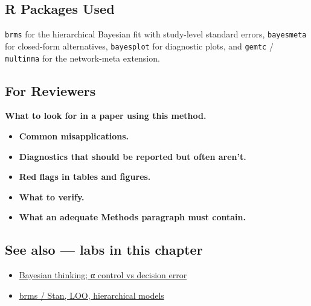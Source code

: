 \documentclass[
]{article}
\providecommand{\tightlist}{%
  \setlength{\itemsep}{0pt}\setlength{\parskip}{0pt}}
\begin{document}
\subsection{R Packages Used}\label{r-packages-used}

\texttt{brms} for the hierarchical Bayesian fit with study-level
standard errors, \texttt{bayesmeta} for closed-form alternatives,
\texttt{bayesplot} for diagnostic plots, and \texttt{gemtc} /
\texttt{multinma} for the network-meta extension.

\subsection{For Reviewers}\label{for-reviewers}

\textbf{What to look for in a paper using this method.}

\begin{itemize}
\tightlist
\item
  \textbf{Common misapplications.}
\item
  \textbf{Diagnostics that should be reported but often aren't.}
\item
  \textbf{Red flags in tables and figures.}
\item
  \textbf{What to verify.}
\item
  \textbf{What an adequate Methods paragraph must contain.}
\end{itemize}

\subsection{See also --- labs in this
chapter}\label{see-also-labs-in-this-chapter}

\begin{itemize}
\tightlist
\item
  \href{labs/lab-bayesian-thinking-control-vs-decision-error.Rmd}{Bayesian
  thinking; α control vs decision error}
\item
  \href{labs/lab-brms-stan-loo-hierarchical-models.Rmd}{brms / Stan,
  LOO, hierarchical models}
\end{itemize}
\end{document}
